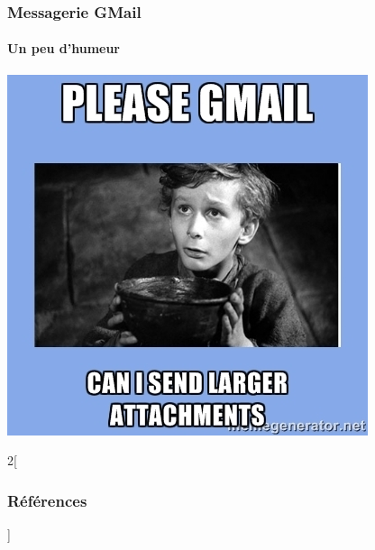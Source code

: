 \documentclass[xcolor=table]{beamer}
\begin{document}
\begin{frame}
\frametitle{Messagerie GMail}
\framesubtitle{Un peu d'humeur}

\begin{center}
	\includegraphics[height=.8\textheight]{..//img/Bweb02-ri-gmail/gmail-humour.jpg}
\end{center}

\end{frame}


%
%
%	
%	
%	
%

\nocite{*}
%
% 

\begin{multicols*}{2}[\frametitle{Références}]%
	\tiny
	
	
\end{multicols*}
\end{document}
